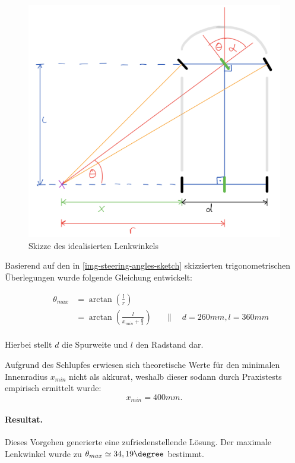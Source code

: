 \documentclass[a4paper,12pt]{report}
\begin{document}
	\begin{figure}[ht]
		\centering
		\includegraphics[width=\textwidth,height=\textheight,keepaspectratio]{assets/Lenkwinkel-Skizze.png}
		\caption{Skizze des idealisierten Lenkwinkels}
		\label{img-steering-angles-sketch}
	\end{figure}
	\pagebreak

	Basierend auf den in \autoref{img-steering-angles-sketch} skizzierten trigonometrischen Überlegungen wurde folgende Gleichung entwickelt:

	\begin{align*}
		&&\theta_{max} &= \arctan\left( \frac{l}{r} \right)\\
		&&&= \arctan\left( \frac{l}{x_{min} + \frac{d}{2}} \right) &&\|\quad d = 260mm, l = 360mm
	\end{align*}
	\\
	Hierbei stellt $d$ die Spurweite und $l$ den Radstand dar.

	Aufgrund des Schlupfes erwiesen sich theoretische Werte für den minimalen Innenradius $x_{min}$ nicht als akkurat, weshalb dieser sodann durch  Praxistests %
	empirisch ermittelt wurde:
		\[x_{min} = 400mm.\]

	\paragraph{Resultat.}
	Dieses Vorgehen generierte eine zufriedenstellende Lösung.
	Der maximale Lenkwinkel wurde zu $\theta_{max} \simeq 34,19\degree$ bestimmt.
\end{document}
